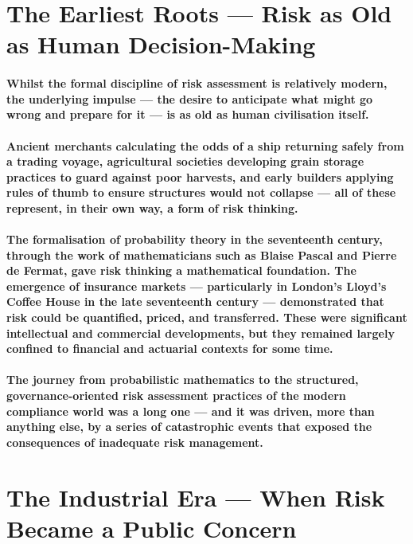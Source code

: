 \section{The Earliest Roots — Risk as Old as Human Decision-Making}
\paragraph{Whilst the formal discipline of risk assessment is relatively modern, the underlying impulse — the desire to anticipate what might go wrong and prepare for it — is as old as human civilisation itself.}
\paragraph{Ancient merchants calculating the odds of a ship returning safely from a trading voyage, agricultural societies developing grain storage practices to guard against poor harvests, and early builders applying rules of thumb to ensure structures would not collapse — all of these represent, in their own way, a form of risk thinking.}
\paragraph{The formalisation of probability theory in the seventeenth century, through the work of mathematicians such as Blaise Pascal and Pierre de Fermat, gave risk thinking a mathematical foundation. The emergence of insurance markets — particularly in London's Lloyd's Coffee House in the late seventeenth century — demonstrated that risk could be quantified, priced, and transferred. These were significant intellectual and commercial developments, but they remained largely confined to financial and actuarial contexts for some time.}
\paragraph{The journey from probabilistic mathematics to the structured, governance-oriented risk assessment practices of the modern compliance world was a long one — and it was driven, more than anything else, by a series of catastrophic events that exposed the consequences of inadequate risk management.}

\section{The Industrial Era — When Risk Became a Public Concern}
